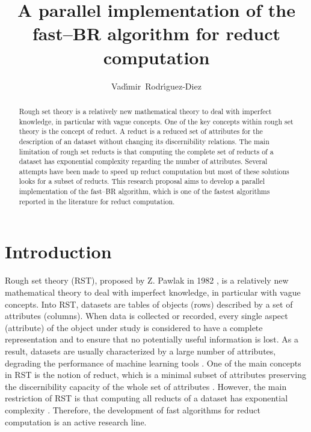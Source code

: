\documentclass[citenumber]{elsarticle}
\begin{document}
%
\title{A parallel implementation of the fast--BR algorithm for reduct computation}

	\author[inaoe,uc]{Vad\'{\i}mir~Rodr\'{\i}guez-Diez}
	\address[inaoe]{Computer Science Department\\
					Instituto Nacional de Astrof\'{\i}sica, \'{O}ptica y Electr\'{o}nica\\
					Luis Enrique Erro \# 1, Santa Mar\'{\i}a Tonantzintla, Puebla, 72840, M\'{e}xico} 
	\address[uc]{Electrical Engineering Department\\
				 Universidad de Camag\"{u}ey\\
				 Circv. Nte. km 5$\frac{1}{2}$, Camag\"{u}ey, Cuba}

%
\begin{abstract}
%
	Rough set theory is a relatively new mathematical theory to deal with imperfect knowledge, in particular with vague concepts. One of the key concepts within rough set theory is the concept of reduct. A reduct is a reduced set of attributes for the description of an dataset without changing its discernibility relations. The main limitation of rough set reducts is that computing the complete set of reducts of a dataset has exponential complexity regarding the number of attributes. Several attempts have been made to speed up reduct computation but most of these solutions looks for a subset of reducts.  This research proposal aims to develop a parallel implementation of the fast--BR algorithm, which is one of the fastest algorithms reported in the literature for reduct computation.
%
\end{abstract}
%
	\maketitle
%
\section{Introduction}
%
	Rough set theory (RST), proposed by Z. Pawlak in 1982 \cite{Pawlak81}, is a relatively new mathematical theory to deal with imperfect knowledge, in particular with vague concepts. Into RST, datasets are tables of objects (rows) described by a set of attributes (columns). When data is collected or recorded, every single aspect (attribute) of the object under study is considered to have a complete representation and to ensure that no potentially useful information is lost. As a result, datasets are usually characterized by a large number of attributes,  degrading the performance of machine learning tools \cite{Parthalain08}. One of the main concepts in RST is the notion of reduct, which is a minimal subset of attributes preserving the discernibility capacity of the whole set of attributes \cite{Pawlak91}. However, the main restriction of RST is that computing all reducts of a dataset has exponential complexity \cite{Skowron92}. Therefore, the development of fast algorithms for reduct computation is an active research line.
  
\end{document}
